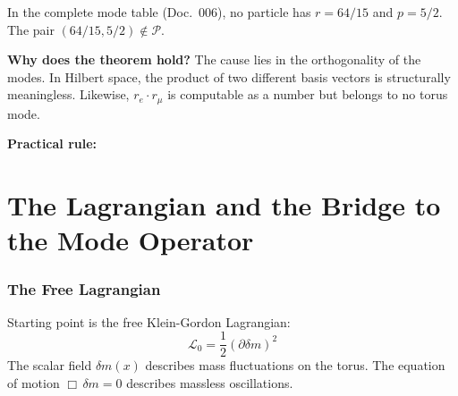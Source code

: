 In the complete mode table (Doc.~006), no particle has $r = 64/15$
and $p = 5/2$. The pair $(64/15, 5/2) \notin \mathcal{P}$.

\textbf{Why does the theorem hold?} The cause lies in the orthogonality
of the modes. In Hilbert space, the product of two different basis
vectors is structurally meaningless. Likewise, $r_e \cdot r_\mu$ is
computable as a number but belongs to no torus mode.

\textbf{Practical rule:}

\begin{center}
{\footnotesize
{}
}
\end{center}

\part{The Lagrangian and the Bridge to the Mode Operator}

\section{The Free Lagrangian}

Starting point is the free Klein-Gordon Lagrangian:
\begin{equation}
  \mathcal{L}_0 = \frac{1}{2}(\partial\delta m)^2
\end{equation}
The scalar field $\delta m(x)$ describes mass fluctuations on the torus.
The equation of motion $\Box\,\delta m = 0$ describes massless oscillations.

